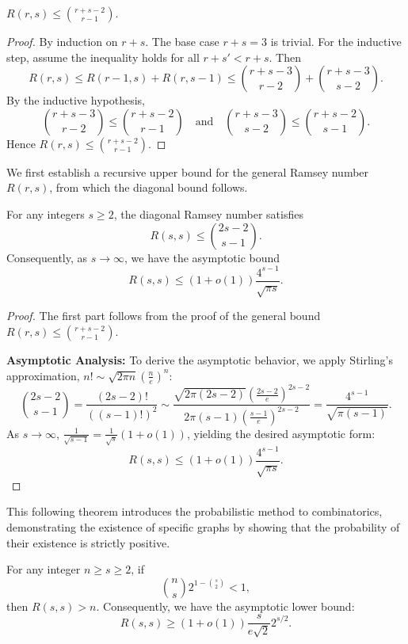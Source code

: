 \documentclass[11pt, a4paper]{ctexrep}
\begin{document}
\begin{corollary}
    $R(r,s) \le \binom{r+s-2}{r-1}$.
\end{corollary}

\begin{proof}
    By induction on $r+s$. The base case $r+s=3$ is trivial. For the inductive step,
    assume the inequality holds for all $r+s'<r+s$. Then
    \[
        R(r,s)\le R(r-1,s)+R(r,s-1)\le \binom{r+s-3}{r-2}+\binom{r+s-3}{s-2}.
    \]
    By the inductive hypothesis,
    \[
        \binom{r+s-3}{r-2}\le \binom{r+s-2}{r-1} \quad \text{and} \quad \binom{r+s-3}{s-2}\le \binom{r+s-2}{s-1}.
    \]
    Hence $R(r,s)\le \binom{r+s-2}{r-1}$.
\end{proof}

We first establish a recursive upper bound for the general Ramsey number $R(r, s)$, from which the diagonal bound follows.

\begin{theorem}
    For any integers $s \ge 2$, the diagonal Ramsey number satisfies
    $$ R(s, s) \le \binom{2s - 2}{s - 1}. $$
    Consequently, as $s \to \infty$, we have the asymptotic bound
    $$ R(s, s) \le (1 + o(1)) \frac{4^{s-1}}{\sqrt{\pi s}}. $$
\end{theorem}

\begin{proof}
    The first part follows from the proof of the general bound $R(r, s) \le \binom{r+s-2}{r-1}$.

    \textbf{Asymptotic Analysis:} To derive the asymptotic behavior, we apply Stirling's approximation, $n! \sim \sqrt{2\pi n} \left(\frac{n}{e}\right)^n$:
    $$ \binom{2s - 2}{s - 1} = \frac{(2s-2)!}{((s-1)!)^2} \sim \frac{\sqrt{2\pi(2s-2)} \left(\frac{2s-2}{e}\right)^{2s-2}}{2\pi(s-1) \left(\frac{s-1}{e}\right)^{2s-2}} = \frac{4^{s-1}}{\sqrt{\pi(s-1)}}. $$
    As $s \to \infty$, $\frac{1}{\sqrt{s-1}} = \frac{1}{\sqrt{s}}(1+o(1))$, yielding the desired asymptotic form:
    $$ R(s, s) \le (1 + o(1)) \frac{4^{s-1}}{\sqrt{\pi s}}. $$
\end{proof}

This following theorem introduces the probabilistic method to combinatorics, demonstrating the existence of specific graphs by showing that the probability of their existence is strictly positive.

\begin{theorem}
    For any integer $n \ge s \ge 2$, if
    $$ \binom{n}{s} 2^{1 - \binom{s}{2}} < 1, $$
    then $R(s, s) > n$. Consequently, we have the asymptotic lower bound:
    $$ R(s, s) \ge (1 + o(1)) \frac{s}{e\sqrt{2}} 2^{s/2}. $$
\end{theorem}
\end{document}
